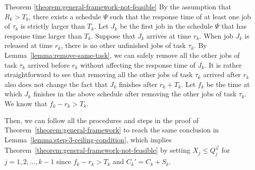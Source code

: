 \begin{appProof}{Theorem \ref{theorem:general-framework-not-feasible}}
  By the assumption that $R_k > T_k$, there exists a schedule $\Psi$
  such that the response time of at least one job of $\tau_k$ is strictly larger than
  $T_k$. Let $J_k$ be the first job in the schedule $\Psi$ that has
  response time larger than $T_k$. Suppose that $J_{k}$ arrives at
  time $r_k$. When job $J_k$ is released at time $r_k$, there is no
  other unfinished jobs of task $\tau_k$. By
  Lemma~\ref{lemma:remove-same-task}, we can safely remove all the
  other jobs of task $\tau_k$ arrived before $r_k$ without affecting
  the response time of $J_k$. It is rather straightforward to see that
  removing all the other jobs of task $\tau_k$ arrived after $r_k$
  also does not change the fact that $J_k$ finishes after
  $r_k+T_k$. Let $f_k$ be the time at which $J_k$ finishes in the
  above schedule after removing the other jobs of task $\tau_k$. We
  know that $f_k - r_k > T_k$.

  Then, we can follow all the procedures and steps in the proof of
  Theorem~\ref{theorem:general-framework} to reach the same conclusion
  in Lemma~\ref{lemma:step-3-ceiling-condition}, which implies
  Theorem~\ref{theorem:general-framework-not-feasible} by setting $X_j
  \leq Q_j^{\vec{x}}$ for $j=1,2,\ldots,k-1$ since $f_k-r_k > T_k$ and
  $C_k'=C_k+S_k$.
\end{appProof}




